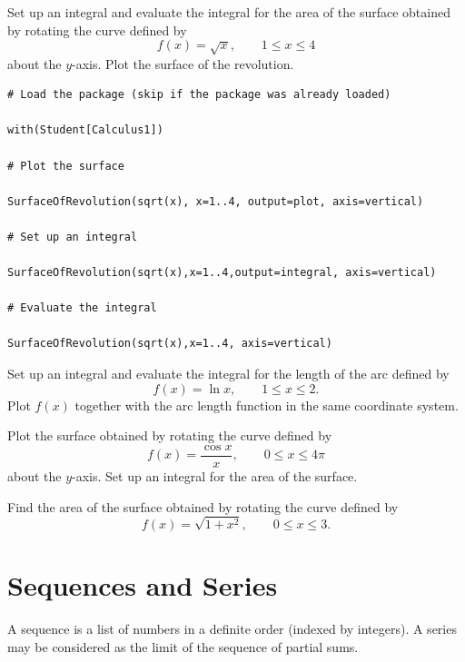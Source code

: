 \documentclass[]{book}
\theoremstyle{definition}
\theoremstyle{definition}
\theoremstyle{definition}
\theoremstyle{remark}
\let\BeginKnitrBlock\begin \let\EndKnitrBlock\end
\begin{document}
\BeginKnitrBlock{example}
\protect\hypertarget{exm:unnamed-chunk-3}{}{\label{exm:unnamed-chunk-3} }
Set up an integral and evaluate the integral for the area of the surface obtained by rotating the curve defined by
\[
f(x)=\sqrt{x},\qquad 1\leq x\leq 4
\]
about the \(y\)-axis. Plot the surface of the revolution.
\EndKnitrBlock{example}

\BeginKnitrBlock{solution}
{}

\begin{verbatim}
# Load the package (skip if the package was already loaded)

with(Student[Calculus1])

# Plot the surface

SurfaceOfRevolution(sqrt(x), x=1..4, output=plot, axis=vertical)

# Set up an integral

SurfaceOfRevolution(sqrt(x),x=1..4,output=integral, axis=vertical)

# Evaluate the integral

SurfaceOfRevolution(sqrt(x),x=1..4, axis=vertical)
\end{verbatim}
\EndKnitrBlock{solution}

\BeginKnitrBlock{exercise}
\protect\hypertarget{exr:unnamed-chunk-5}{}{\label{exr:unnamed-chunk-5} }
Set up an integral and evaluate the integral for the length of the arc defined by
\[
f(x)=\ln x, \qquad 1\leq x\leq 2.
\]
Plot \(f(x)\) together with the arc length function in the same coordinate system.
\EndKnitrBlock{exercise}

\BeginKnitrBlock{exercise}
\protect\hypertarget{exr:unnamed-chunk-6}{}{\label{exr:unnamed-chunk-6} }
Plot the surface obtained by rotating the curve defined by
\[
f(x)=\frac{\cos x}{x}, \qquad 0\leq x\leq 4\pi
\]
about the \(y\)-axis. Set up an integral for the area of the surface.
\EndKnitrBlock{exercise}

\BeginKnitrBlock{exercise}
\protect\hypertarget{exr:unnamed-chunk-7}{}{\label{exr:unnamed-chunk-7} }
Find the area of the surface obtained by rotating the curve defined by
\[
f(x)=\sqrt{1+x^2},\qquad 0\leq x\leq 3.
\]
\EndKnitrBlock{exercise}

\hypertarget{sequences-and-series}{%
\chapter{Sequences and Series}\label{sequences-and-series}}

A sequence is a list of numbers in a definite order (indexed by integers). A series may be considered as the limit of the sequence of partial sums.
\end{document}
